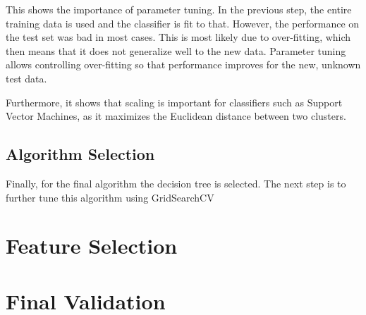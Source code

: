 \documentclass[11pt]{article} %
\begin{document}
This shows the importance of parameter tuning. In the previous step, the entire training data is used and the classifier is fit to that. However, the performance on the test set was bad in most cases. This is most likely due to over-fitting, which then means that it does not generalize well to the new data. Parameter tuning allows controlling over-fitting so that performance improves for the new, unknown test data. \medskip

Furthermore, it shows that scaling is important for classifiers such as Support Vector Machines, as it maximizes the Euclidean distance between two clusters.

\subsection{Algorithm Selection}
Finally, for the final algorithm the decision tree is selected. The next step is to further tune this algorithm using {\selectfont GridSearchCV}

\section{Feature Selection}

\section{Final Validation}
\end{document}
